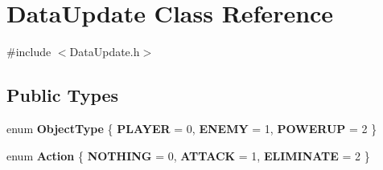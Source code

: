 \hypertarget{class_data_update}{}\section{Data\+Update Class Reference}
\label{class_data_update}


{\ttfamily \#include $<$Data\+Update.\+h$>$}

\subsection*{Public Types}
\begin{DoxyCompactItemize}
\item 
\mbox{\label{class_data_update_af4831955bc0c96677449912828a76186}} 
enum {\bfseries Object\+Type} \{ {\bfseries P\+L\+A\+Y\+ER} = 0, 
{\bfseries E\+N\+E\+MY} = 1, 
{\bfseries P\+O\+W\+E\+R\+UP} = 2
 \}
\item 
\mbox{\label{class_data_update_abb85ab19ced4c140156941dd3dd68a3e}} 
enum {\bfseries Action} \{ {\bfseries N\+O\+T\+H\+I\+NG} = 0, 
{\bfseries A\+T\+T\+A\+CK} = 1, 
{\bfseries E\+L\+I\+M\+I\+N\+A\+TE} = 2
 \}
\end{DoxyCompactItemize}
